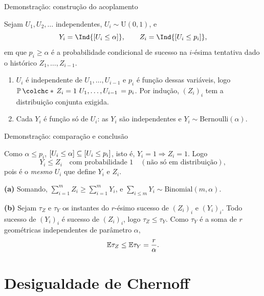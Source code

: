 \documentclass[aspectratio=169]{beamer}
\begin{document}

\begin{frame}{Demonstração: construção do acoplamento}

    Sejam $U_1,U_2,\dots$ independentes, $U_i\sim\mathrm{U}(0,1)$, e
    \[
      Y_i=\Ind{\colch{U_i\leq \alpha}}, \qquad
      Z_i=\Ind{\colch{U_i\leq p_i}},
    \]
    em que $p_i\geq\alpha$ é a probabilidade condicional de sucesso na
    $i$-ésima tentativa dado o histórico $Z_1,\dots,Z_{i-1}$.

    \vfill

    \begin{enumerate}\itemsep=.3cm
    \item $U_i$ é independente de $U_1,\dots,U_{i-1}$ e $p_i$ é função
      dessas variáveis, logo
      $\ProbCE{Z_i=1}{U_1,\dots,U_{i-1}}=p_i$. Por indução, $(Z_i)_i$
      tem a distribuição conjunta exigida.
    \item Cada $Y_i$ é função só de $U_i$: as $Y_i$ são independentes
      e $Y_i\sim\mathrm{Bernoulli}(\alpha)$.
    \end{enumerate}

\end{frame}

\begin{frame}{Demonstração: comparação e conclusão}

    Como $\alpha\leq p_i$,
    $\lbrack U_i\leq\alpha\rbrack\subseteq\lbrack U_i\leq p_i\rbrack$, isto é,
    $Y_i=1\Rightarrow Z_i=1$. Logo
    \[
      Y_i\leq Z_i \quad\text{com probabilidade }1
      \quad(\text{não só em distribuição}),
    \]
    pois é o \emph{mesmo} $U_i$ que define $Y_i$ e $Z_i$.

    \vfill

    \textbf{(a)} Somando, $\sum_{i=1}^mZ_i\geq\sum_{i=1}^mY_i$, e
    $\sum_{i\leq m}Y_i\sim\mathrm{Binomial}(m,\alpha)$.

    \vfill

    \textbf{(b)} Sejam $\tau_Z$ e $\tau_Y$ os instantes do $r$-ésimo
    sucesso de $(Z_i)_i$ e $(Y_i)_i$. Todo sucesso de $(Y_i)_i$ é
    sucesso de $(Z_i)_i$, logo $\tau_Z\leq\tau_Y$. Como $\tau_Y$ é a
    soma de $r$ geométricas independentes de parâmetro $\alpha$,
    \[
      \mathbb{E}{\tau_Z}\leq\mathbb{E}{\tau_Y}=\frac{r}{\alpha}.
    \]


\end{frame}


\section{Desigualdade de Chernoff}
\end{document}
